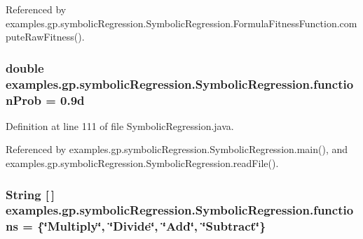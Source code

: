Referenced by examples.\-gp.\-symbolic\-Regression.\-Symbolic\-Regression.\-Formula\-Fitness\-Function.\-compute\-Raw\-Fitness().

\hypertarget{classexamples_1_1gp_1_1symbolic_regression_1_1_symbolic_regression_a66d160306b4d02a0b5b48bade063980f}{
\subsubsection[{function\-Prob}]{\setlength{\rightskip}{0pt plus 5cm}double examples.\-gp.\-symbolic\-Regression.\-Symbolic\-Regression.\-function\-Prob = 0.\-9d\hspace{0.3cm}{\ttfamily [static]}}}\label{classexamples_1_1gp_1_1symbolic_regression_1_1_symbolic_regression_a66d160306b4d02a0b5b48bade063980f}


Definition at line 111 of file Symbolic\-Regression.\-java.



Referenced by examples.\-gp.\-symbolic\-Regression.\-Symbolic\-Regression.\-main(), and examples.\-gp.\-symbolic\-Regression.\-Symbolic\-Regression.\-read\-File().

\hypertarget{classexamples_1_1gp_1_1symbolic_regression_1_1_symbolic_regression_a0b927896439021fdfefc038f4da13134}{
\subsubsection[{functions}]{\setlength{\rightskip}{0pt plus 5cm}String \mbox{[}$\,$\mbox{]} examples.\-gp.\-symbolic\-Regression.\-Symbolic\-Regression.\-functions = \{\char`\"{}Multiply\char`\"{}, \char`\"{}Divide\char`\"{}, \char`\"{}Add\char`\"{}, \char`\"{}Subtract\char`\"{}\}\hspace{0.3cm}{\ttfamily [static]}}}\label{classexamples_1_1gp_1_1symbolic_regression_1_1_symbolic_regression_a0b927896439021fdfefc038f4da13134}


